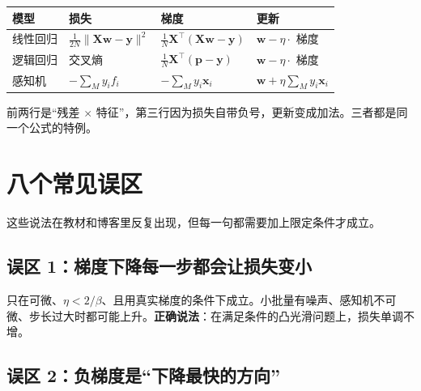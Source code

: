 \documentclass[UTF8, a4paper, zihao=-4, fontset=none]{ctexart}
\begin{document}
\begin{center}
\footnotesize
\setlength{\tabcolsep}{3pt}
\begin{tabularx}{\linewidth}{@{}>{\hsize=1.053\hsize\raggedright\arraybackslash}X>{\hsize=0.842\hsize\raggedright\arraybackslash}X>{\hsize=0.842\hsize\raggedright\arraybackslash}X>{\hsize=1.263\hsize\raggedright\arraybackslash}X@{}}
\toprule
\textbf{模型} & \textbf{损失} & \textbf{梯度} & \textbf{更新} \\
\midrule
线性回归 & $\frac{1}{2N}\|\mathbf{X}\mathbf{w}-\mathbf{y}\|^2$ & $\frac1N\mathbf{X}^\top(\mathbf{X}\mathbf{w}-\mathbf{y})$ & $\mathbf{w}-\eta\cdot$ 梯度 \\
逻辑回归 & 交叉熵 & $\frac1N\mathbf{X}^\top(\mathbf{p}-\mathbf{y})$ & $\mathbf{w}-\eta\cdot$ 梯度 \\
感知机 & $-\sum_{M}y_i f_i$ & $-\sum_{M}y_i\mathbf{x}_i$ & $\mathbf{w}+\eta\sum_{M}y_i\mathbf{x}_i$ \\
\bottomrule
\end{tabularx}
\end{center}
{\footnotesize\color{gray}\raggedright 前两行是“残差 \ensuremath{\times} 特征”，第三行因为损失自带负号，更新变成加法。三者都是同一个公式的特例。\par}




\section{八个常见误区}



这些说法在教材和博客里反复出现，但每一句都需要加上限定条件才成立。




\subsection*{误区 1：梯度下降每一步都会让损失变小}



只在可微、$\eta<2/\beta$、且用真实梯度的条件下成立。小批量有噪声、感知机不可微、步长过大时都可能上升。\textbf{正确说法}：在满足条件的凸光滑问题上，损失单调不增。




\subsection*{误区 2：负梯度是“下降最快的方向”}
\end{document}
